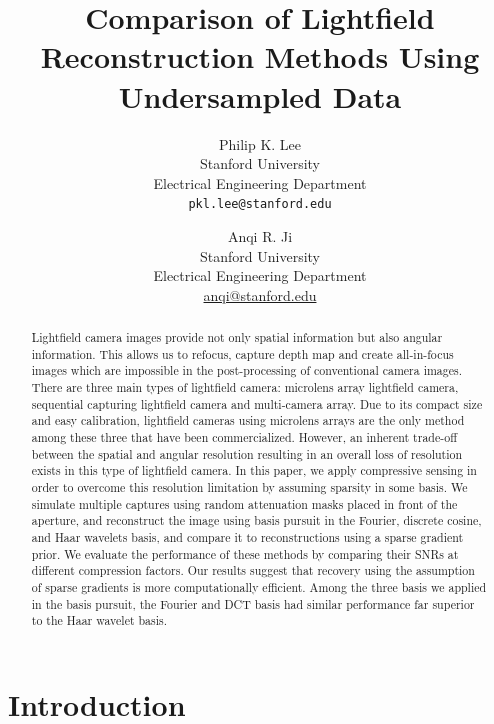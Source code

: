 \documentclass[10pt,twocolumn,letterpaper]{article}
\begin{document}
\title{Comparison of Lightfield Reconstruction Methods Using Undersampled Data}

\author{Philip K. Lee\\
Stanford University\\
Electrical Engineering Department\\
{\tt\small pkl.lee@stanford.edu}
\and
Anqi R. Ji\\
Stanford University\\
Electrical Engineering Department\\
{\small\url{anqi@stanford.edu}}
}

\maketitle
\thispagestyle{empty}

\begin{abstract}
Lightfield camera images provide not only spatial information but also angular information. This allows us to refocus, capture depth map and create all-in-focus images which are impossible in the post-processing of conventional camera images. There are three main types of lightfield camera: microlens array lightfield camera, sequential capturing lightfield camera and multi-camera array. Due to its compact size and easy calibration, lightfield cameras using microlens arrays are the only method among these three that have been commercialized. However, an inherent trade-off between the spatial and angular resolution resulting in an overall loss of resolution exists in this type of lightfield camera. In this paper, we apply compressive sensing in order to overcome this resolution limitation by assuming sparsity in some basis. We simulate multiple captures using random attenuation masks placed in front of the aperture, and reconstruct the image using basis pursuit in the Fourier, discrete cosine, and Haar wavelets basis, and compare it to reconstructions using a sparse gradient prior. We evaluate the performance of these methods by comparing their SNRs at different compression factors. Our results suggest that recovery using the assumption of sparse gradients is more computationally efficient. Among the three basis we applied in the basis pursuit, the Fourier and DCT basis had similar performance far superior to the Haar wavelet basis.


\end{abstract}

\section{Introduction}
\end{document}
